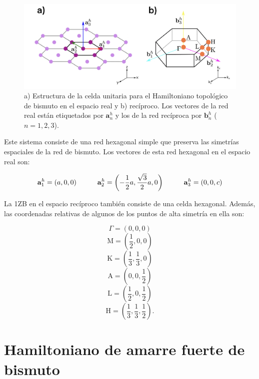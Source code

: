 \documentclass[
  letterpaper,
  DIV=11,
  numbers=noendperiod]{scrreprt}
\begin{document}
\begin{figure}

{\centering \includegraphics{./images/HexRealRec.png}

}

\caption{\label{fig-HexRealRec}a) Estructura de la celda unitaria para
el Hamiltoniano topológico de bismuto en el espacio real y b) recíproco.
Los vectores de la red real están etiquetados por \(\mathbf{a}^h_n\) y
los de la red recíproca por \(\mathbf{b}^h_n\) (\(n=1,2,3\)).}

\end{figure}

Este sistema consiste de una red hexagonal simple que preserva las
simetrías espaciales de la red de bismuto. Los vectores de esta red
hexagonal en el espacio real son:

\[
\begin{align} 
    \mathbf{a}_1^h = \left (a,0,0 \right ) \hspace{10mm}
    \mathbf{a}_2^h = \left ( -\frac{1}{2}a , \frac{\sqrt{3}}{2}a , 0 \right ) \hspace{10mm}
    \mathbf{a}_3^h = \left (             0 , 0,c \right ) 
\end{align}
\]

La 1ZB en el espacio recíproco también consiste de una celda hexagonal.
Además, las coordenadas relativas de algunos de los puntos de alta
simetría en ella son:

\[    
\Gamma = \left ( 0,0,0 \right )
\] \[
    \mathrm{M} = \left ( \frac{1}{2},0,0 \right ) 
\] \[
    \mathrm{K} = \left ( \frac{1}{3},\frac{1}{3},0 \right ) 
\] \[
    \mathrm{A} = \left ( 0,0, \frac{1}{2} \right )
\] \[
    \mathrm{L} = \left ( \frac{1}{2},0,\frac{1}{2} \right ) 
\] \[
    \mathrm{H} = \left ( \frac{1}{3},\frac{1}{3},\frac{1}{2} \right ).
\]


\hypertarget{sec-hamiltonian}{%
\chapter{Hamiltoniano de amarre fuerte de
bismuto}\label{sec-hamiltonian}}
\end{document}
